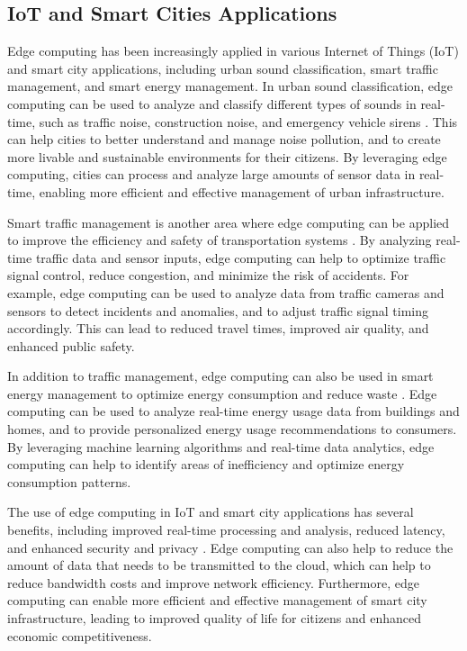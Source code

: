 \documentclass[11pt]{article}
\begin{document}
\subsection{IoT and Smart Cities Applications}

Edge computing has been increasingly applied in various Internet of Things (IoT) and smart city applications, including urban sound classification, smart traffic management, and smart energy management. In urban sound classification, edge computing can be used to analyze and classify different types of sounds in real-time, such as traffic noise, construction noise, and emergency vehicle sirens \cite{ref45}. This can help cities to better understand and manage noise pollution, and to create more livable and sustainable environments for their citizens. By leveraging edge computing, cities can process and analyze large amounts of sensor data in real-time, enabling more efficient and effective management of urban infrastructure.

Smart traffic management is another area where edge computing can be applied to improve the efficiency and safety of transportation systems \cite{ref46}. By analyzing real-time traffic data and sensor inputs, edge computing can help to optimize traffic signal control, reduce congestion, and minimize the risk of accidents. For example, edge computing can be used to analyze data from traffic cameras and sensors to detect incidents and anomalies, and to adjust traffic signal timing accordingly. This can lead to reduced travel times, improved air quality, and enhanced public safety.

In addition to traffic management, edge computing can also be used in smart energy management to optimize energy consumption and reduce waste \cite{ref47}. Edge computing can be used to analyze real-time energy usage data from buildings and homes, and to provide personalized energy usage recommendations to consumers. By leveraging machine learning algorithms and real-time data analytics, edge computing can help to identify areas of inefficiency and optimize energy consumption patterns.

The use of edge computing in IoT and smart city applications has several benefits, including improved real-time processing and analysis, reduced latency, and enhanced security and privacy \cite{ref3}. Edge computing can also help to reduce the amount of data that needs to be transmitted to the cloud, which can help to reduce bandwidth costs and improve network efficiency. Furthermore, edge computing can enable more efficient and effective management of smart city infrastructure, leading to improved quality of life for citizens and enhanced economic competitiveness.
\end{document}
